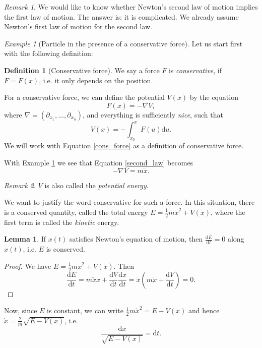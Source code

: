 \documentclass[11pt]{amsart}
\numberwithin{equation}{section}
\theoremstyle{plain}
\theoremstyle{definition}
\newtheorem{defn}{Definition}[subsection]
\newtheorem{lem}{Lemma}[subsection]
\theoremstyle{remark}
\newtheorem{rem}{Remark}[subsection]
\newtheorem{ex}{Example}[subsection]
\newcommand{\dd}{{\mathrm{d}}}
\begin{document}
\begin{rem}
We would like to know whether Newton's second law of motion implies the first law of motion. The answer is: it is complicated. We already assume Newton's first law of motion for the second law. 
\end{rem}

\begin{ex}[Particle in the presence of a conservative force]
\label{part_cons_force}
Let us start first with the following definition:

\begin{defn}[Conservative force]
We say a force $F$ is \emph{conservative}, if $F=F(x)$, i.e. it only depends on the position.
\end{defn}

For a conservative force, we can define the potential $V(x)$ by the equation
\begin{equation}
\label{cons_force}
F(x)=-\nabla V,
\end{equation}
where $\nabla=(\partial_{x_1},...,\partial_{x_n})$, and everything is sufficiently \emph{nice}, such that 
\[
V(x)=-\int_{x_0}^xF(u)\dd u.
\]
We will work with Equation \eqref{cons_force} as a definition of conservative force. 
\end{ex}
With Example \ref{part_cons_force} we see that Equation \eqref{second_law} becomes 
\begin{equation}
\label{pot_second_law}
-\nabla V=m\ddot{x}.
\end{equation}
\begin{rem}
$V$ is also called the \emph{potential energy}.
\end{rem}

We want to justify the word conservative for such a force. In this situation, there is a conserved quantity, called the total energy $E=\frac{1}{2}m\dot{x}^2+V(x)$, where the first term is called the \emph{kinetic} energy. 

\begin{lem}
If $x(t)$ satisfies Newton's equation of motion, then $\frac{\dd E}{\dd t}=0$ along $x(t)$, i.e. $E$ is conserved.
\end{lem}

\begin{proof}
We have $E=\frac{1}{2}m\dot{x}^2+V(x)$. Then 
\[
\frac{\dd E}{\dd t}=m\ddot{x}\dot{x}+\frac{\dd V}{\dd t}\frac{\dd x}{\dd t}=\dot{x}\left(m\ddot{x}+\frac{\dd V}{\dd t}\right)=0.
\]
\end{proof}
Now, since $E$ is constant, we can write $\frac{1}{2}m\dot{x}^2=E-V(x)$ and hence $\dot{x}=\frac{2}{m}\sqrt{E-V(x)}$, i.e. 
\begin{equation}
\label{id1}
\frac{\dd x}{\sqrt{E-V(x)}}=\dd t.
\end{equation}
\end{document}
